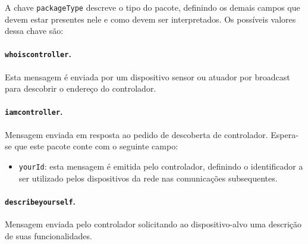 A chave \texttt{packageType} descreve o tipo do pacote, definindo os demais campos que devem estar presentes nele e como devem ser interpretados. Os possíveis valores dessa chave são:

\paragraph*{\texttt{whoiscontroller}.} Esta mensagem é enviada por um dispositivo sensor ou atuador  por broadcast para descobrir o endereço do controlador. 

\paragraph*{\texttt{iamcontroller}.} Mensagem enviada em resposta ao pedido de descoberta de controlador. Espera-se que este pacote conte com o seguinte campo:
\begin{itemize}
	\item \texttt{yourId}: esta mensagem é emitida pelo controlador, definindo o identificador a ser utilizado pelos dispositivos da rede nas comunicações subsequentes.
\end{itemize}

\paragraph*{\texttt{describeyourself}.} Mensagem enviada pelo controlador solicitando ao dispositivo-alvo uma descrição de suas funcionalidades.

